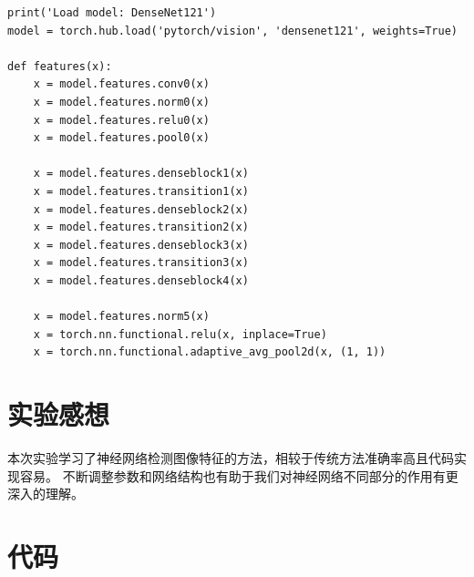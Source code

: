 \documentclass{article}
\begin{document}
\begin{lstlisting}
print('Load model: DenseNet121')
model = torch.hub.load('pytorch/vision', 'densenet121', weights=True)

def features(x):
    x = model.features.conv0(x)
    x = model.features.norm0(x)
    x = model.features.relu0(x)
    x = model.features.pool0(x)

    x = model.features.denseblock1(x)
    x = model.features.transition1(x)
    x = model.features.denseblock2(x)
    x = model.features.transition2(x)
    x = model.features.denseblock3(x)
    x = model.features.transition3(x)
    x = model.features.denseblock4(x)

    x = model.features.norm5(x)
    x = torch.nn.functional.relu(x, inplace=True)
    x = torch.nn.functional.adaptive_avg_pool2d(x, (1, 1))

\end{lstlisting}

\section{实验感想}

    本次实验学习了神经网络检测图像特征的方法，相较于传统方法准确率高且代码实现容易。
    不断调整参数和网络结构也有助于我们对神经网络不同部分的作用有更深入的理解。

\section{代码}
\end{document}
